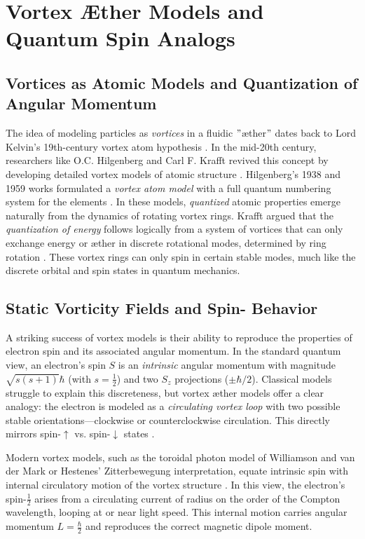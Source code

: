 \chapter*{Vortex Æther Models and Quantum Spin Analogs}


\section*{Vortices as Atomic Models and Quantization of Angular Momentum}

The idea of modeling particles as \textit{vortices} in a fluidic \("\)æther\("\) dates back to Lord Kelvin's 19th-century vortex atom hypothesis \cite{Dennis2020}. In the mid-20th century, researchers like O.C. Hilgenberg and Carl F. Krafft revived this concept by developing detailed vortex models of atomic structure \cite{Hilgenberg1938,KrafftEtherMatter}. Hilgenberg's 1938 and 1959 works formulated a \textit{vortex atom model} with a full quantum numbering system for the elements \cite{ReichBlackSun}. In these models, \textit{quantized} atomic properties emerge naturally from the dynamics of rotating vortex rings. Krafft argued that the \textit{quantization of energy} follows logically from a system of vortices that can only exchange energy or æther in discrete rotational modes, determined by ring rotation \cite{PadrakINE9}. These vortex rings can only spin in certain stable modes, much like the discrete orbital and spin states in quantum mechanics.


\section*{Static Vorticity Fields and Spin-\textonehalf{} Behavior}

A striking success of vortex models is their ability to reproduce the properties of electron spin and its associated angular momentum. In the standard quantum view, an electron's spin $S$ is an \textit{intrinsic} angular momentum with magnitude $\sqrt{s(s+1)}\hbar$ (with $s=\tfrac{1}{2}$) and two $S_z$ projections ($\pm \hbar/2$). Classical models struggle to explain this discreteness, but vortex æther models offer a clear analogy: the electron is modeled as a \textit{circulating vortex loop} with two possible stable orientations—clockwise or counterclockwise circulation. This directly mirrors spin-$\uparrow$ vs. spin-$\downarrow$ states \cite{KrafftEtherMatter}.


Modern vortex models, such as the toroidal photon model of Williamson and van der Mark or Hestenes' Zitterbewegung interpretation, equate intrinsic spin with internal circulatory motion of the vortex structure \cite{HestenesZitterbewegung}. In this view, the electron's spin-$\tfrac{1}{2}$ arises from a circulating current of radius on the order of the Compton wavelength, looping at or near light speed. This internal motion carries angular momentum $L=\tfrac{\hbar}{2}$ and reproduces the correct magnetic dipole moment.


